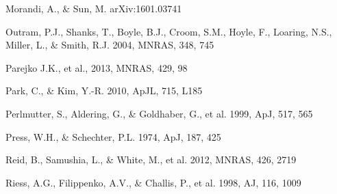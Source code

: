 \documentclass[iop]{emulateapj}
\begin{document}
\begin{thebibliography}{}


Morandi, A., \& Sun, M. arXiv:1601.03741


Outram, P.J., Shanks, T., Boyle, B.J., Croom, S.M., Hoyle, F., Loaring, N.S., 
Miller, L., \& Smith, R.J. 2004, MNRAS, 348, 745  

Parejko J.K., et al., 2013, MNRAS, 429, 98



Park, C., \& Kim, Y.-R. 2010, ApJL, 715, L185  





Perlmutter, S., Aldering, G., \& Goldhaber, G., et al. 1999, ApJ, 517, 565  

Press, W.H., \& Schechter, P.L. 1974, ApJ, 187, 425

Reid, B., Samushia, L., \& White, M., et al. 2012, MNRAS, 426, 2719  


Riess, A.G., Filippenko, A.V., \& Challis, P., et al. 1998, AJ, 116, 1009  



\end{thebibliography}
\end{document}
